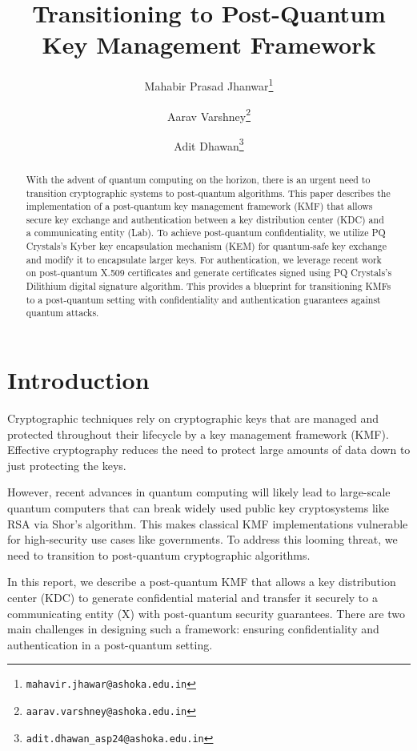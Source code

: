 \documentclass{article}
\title{Transitioning to Post-Quantum Key Management Framework}
\author{ 
}
\author[1]{%
	Mahabir Prasad Jhanwar\thanks{\texttt{mahavir.jhawar@ashoka.edu.in}}}%
\author[1]{%
	Aarav Varshney\thanks{\texttt{aarav.varshney@ashoka.edu.in}}
	}%
\author[1]{%
	Adit Dhawan\thanks{\texttt{adit.dhawan\_asp24@ashoka.edu.in}}
}%
\affil[1]{Department of Computer Science, Ashoka University, Sonipat, India}
\begin{document}
\maketitle

\begin{abstract}
	With the advent of quantum computing on the horizon, there is an urgent need to transition cryptographic systems to post-quantum algorithms. This paper describes the implementation of a post-quantum key management framework (KMF) that allows secure key exchange and authentication between a key distribution center (KDC) and a communicating entity (Lab). To achieve post-quantum confidentiality, we utilize PQ Crystals's Kyber key encapsulation mechanism (KEM) for quantum-safe key exchange and modify it to encapsulate larger keys. For authentication, we leverage recent work on post-quantum X.509 certificates and generate certificates signed using PQ Crystals's Dilithium digital signature algorithm. This provides a blueprint for transitioning KMFs to a post-quantum setting with confidentiality and authentication guarantees against quantum attacks.

\end{abstract}




\section{Introduction}
\label{sec:intro}

Cryptographic techniques rely on cryptographic keys that are managed and protected throughout their lifecycle by a key management framework (KMF). Effective cryptography reduces the need to protect large amounts of data down to just protecting the keys. 

However, recent advances in quantum computing will likely lead to large-scale quantum computers that can break widely used public key cryptosystems like RSA via Shor's algorithm. This makes classical KMF implementations vulnerable for high-security use cases like governments. To address this looming threat, we need to transition to post-quantum cryptographic algorithms.

In this report, we describe a post-quantum KMF that allows a key distribution center (KDC) to generate confidential material and transfer it securely to a communicating entity (X) with post-quantum security guarantees. There are two main challenges in designing such a framework: ensuring confidentiality and authentication in a post-quantum setting. 
\end{document}
